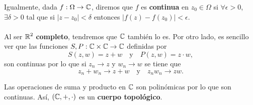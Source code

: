 Igualmente, dada $\displaystyle f : \Omega \to \mathbb{C} $, diremos que $\displaystyle f $ es \textbf{continua} en $\displaystyle z_{0}\in \Omega  $ si $\displaystyle \forall \epsilon > 0 $, $\displaystyle \exists\delta > 0 $ tal que si $\displaystyle \left|z-z_{0}\right|<\delta $ entonces $\displaystyle \left|f\left(z\right)-f\left(z_{0}\right)\right|<\epsilon  $. \\ \\
Al ser $\displaystyle \mathbb{R}^{2} $ \textbf{completo}, tendremos que $\displaystyle \mathbb{C} $ también lo es.
Por otro lado, es sencillo ver que las funciones $\displaystyle S,P : \mathbb{C} \times \mathbb{C} \to \mathbb{C} $ definidas por 
\[S\left(z,w\right)= z + w \quad \text{y} \quad P\left(z,w\right)=z \cdot w ,\]
son continuas por lo que si $\displaystyle z_{n} \to z $ y $\displaystyle w_{n} \to w $ se tiene que 
\[z_{n}+w_{n} \to z + w \quad \text{y} \quad z_{n}w_{n} \to zw .\]

\begin{observation}
Las operaciones de suma y producto en $\displaystyle \mathbb{C} $ son polinómicas por lo que son continuas. Así, $\displaystyle \left(\mathbb{C}, + , \cdot \right) $ es un \textbf{cuerpo topológico}.
\end{observation}

